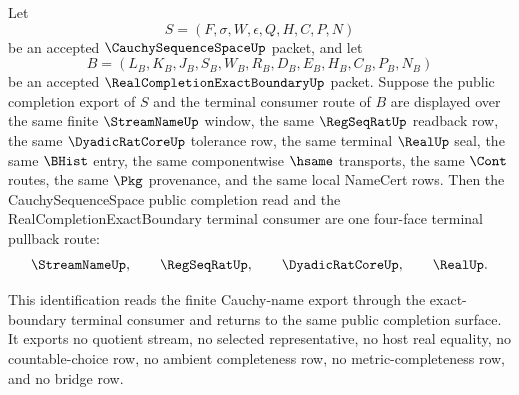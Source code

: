 \begin{theorem}
\label{thm:cauchysequence-space-real-completion-exact-boundary-terminal-pullback}
Let
$$
S=(F,\sigma,W,\epsilon,Q,H,C,P,N)
$$
be an accepted $\CauchySequenceSpaceUp$ packet, and let
$$
B=(L_B,K_B,J_B,S_B,W_B,R_B,D_B,E_B,H_B,C_B,P_B,N_B)
$$
be an accepted $\RealCompletionExactBoundaryUp$ packet. Suppose the public completion export of $S$ and the terminal consumer route of $B$ are displayed over the same finite $\StreamNameUp$ window, the same $\RegSeqRatUp$ readback row, the same $\DyadicRatCoreUp$ tolerance row, the same terminal $\RealUp$ seal, the same $\BHist$ entry, the same componentwise $\hsame$ transports, the same $\Cont$ routes, the same $\Pkg$ provenance, and the same local NameCert rows. Then the CauchySequenceSpace public completion read and the RealCompletionExactBoundary terminal consumer are one four-face terminal pullback route:
$$
\StreamNameUp,\qquad
\RegSeqRatUp,\qquad
\DyadicRatCoreUp,\qquad
\RealUp .
$$

This identification reads the finite Cauchy-name export through the exact-boundary terminal consumer and returns to the same public completion surface. It exports no quotient stream, no selected representative, no host real equality, no countable-choice row, no ambient completeness row, no metric-completeness row, and no bridge row.
\end{theorem}
